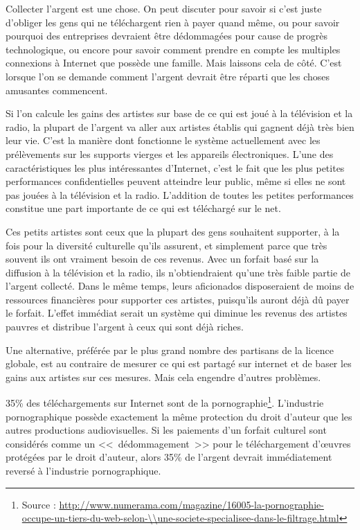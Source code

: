 Collecter l'argent est une chose. On peut discuter pour savoir si c'est juste d'obliger les gens qui ne téléchargent rien à payer quand même, ou pour savoir pourquoi des entreprises devraient être dédommagées pour cause de progrès technologique, ou encore pour savoir comment prendre en compte les multiples connexions à Internet que possède une famille.
Mais laissons cela de côté.
C'est lorsque l'on se demande comment l'argent devrait être réparti que les choses amusantes commencent.

Si l'on calcule les gains des artistes sur base de ce qui est joué à la télévision et la radio, la plupart de l'argent va aller aux artistes établis qui gagnent déjà très bien leur vie.
C'est la manière dont fonctionne le système actuellement avec les prélèvements sur les supports vierges et les appareils électroniques.
L'une des caractéristiques les plus intéressantes d'Internet, c'est le fait que les plus petites performances confidentielles peuvent atteindre leur public, même si elles ne sont pas jouées à la télévision et la radio. L'addition de toutes les petites performances constitue une part importante de ce qui est téléchargé sur le net.

Ces petits artistes sont ceux que la plupart des gens souhaitent supporter, à la fois pour la diversité culturelle qu'ils assurent, et simplement parce que très souvent ils ont vraiment besoin de ces revenus.
Avec un forfait basé sur la diffusion à la télévision et la radio, ils n'obtiendraient qu'une très faible partie de l'argent collecté.
Dans le même temps, leurs aficionados disposeraient de moins de ressources financières pour supporter ces artistes, puisqu'ils auront déjà dû payer le forfait.
L'effet immédiat serait un système qui diminue les revenus des artistes pauvres et distribue l'argent à ceux qui sont déjà riches.

Une alternative, préférée par le plus grand nombre des partisans de la licence globale, est au contraire de mesurer ce qui est partagé sur internet et de baser les gains aux artistes sur ces mesures. Mais cela engendre d'autres problèmes.

35\% des téléchargements sur Internet sont de la pornographie\footnote{Source : \url{http://www.numerama.com/magazine/16005-la-pornographie-occupe-un-tiers-du-web-selon-\\une-societe-specialisee-dans-le-filtrage.html}}.
L'industrie pornographique possède exactement la même protection du droit d'auteur que les autres productions audiovisuelles.
Si les paiements d'un forfait culturel sont considérés comme un <<~dédommagement~>> pour le téléchargement d'œuvres protégées par le droit d'auteur, alors 35\% de l'argent devrait immédiatement reversé à l'industrie pornographique.

